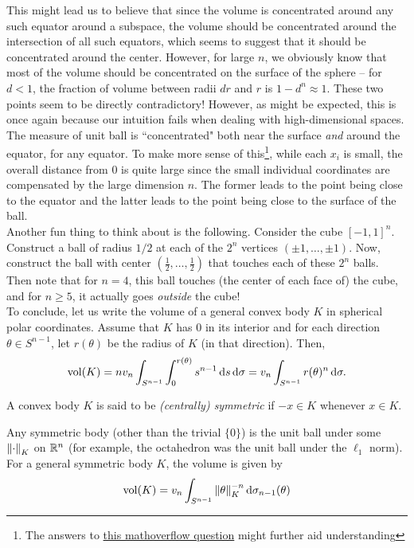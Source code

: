 This might lead us to believe that since the volume is concentrated around any such equator %
around a subspace, the volume should be concentrated around the intersection of all such equators, which seems to suggest that it should be concentrated around the center. However, for large $n$, we obviously know that most of the volume should be concentrated on the surface of the sphere -- for $d < 1$, the fraction of volume between radii $dr$ and $r$ is $1-d^n \approx 1$. These two points seem to be directly contradictory! However, as might be expected, this is once again because our intuition fails when dealing with high-dimensional spaces.\\
The measure of unit ball is ``concentrated" both near the surface \textit{and} around the equator, for any equator. To make more sense of this\footnote{The answers to \href{https://mathoverflow.net/questions/210291/how-to-explain-the-concentration-of-measure-phenomenon-intuitively}{this mathoverflow question} might further aid understanding}, while each $x_i$ is small, the overall distance from $0$ is quite large since the small individual coordinates are compensated by the large dimension $n$. The former leads to the point being close to the equator and the latter leads to the point being close to the surface of the ball.\\

Another fun %
thing to think about is the following. Consider the cube $[-1,1]^n$. Construct a ball of radius $1/2$ at each of the $2^n$ vertices $(\pm 1,\ldots, \pm 1)$. Now, construct the ball with center $(\frac{1}{2},\ldots,\frac{1}{2})$ that touches each of these $2^n$ balls. Then note that for $n=4$, this ball touches (the center of each face of) the cube, and for $n\geq 5$, it actually goes \textit{outside} the cube!\\

To conclude, let us write the volume of a general convex body $K$ in spherical polar coordinates. Assume that $K$ has $0$ in its interior and for each direction $\theta\in S^{n-1}$, let $r(\theta)$ be the radius of $K$ (in that direction). Then,
\begin{equation}
\label{eqn: volume in terms of radial distance}
    \operatorname{vol}(K) = nv_n \int_{S^{n-1}}\int_0^{r(\theta)}s^{n-1}\operatorname{d}\!{s}\operatorname{d}\!{\sigma} = v_n\int_{S^{n-1}} r(\theta)^n\operatorname{d}\!{\sigma}.
\end{equation}

\begin{definition}
A convex body $K$ is said to be \textit{(centrally) symmetric} if $-x\in K$ whenever $x\in K$.
\end{definition}
Any symmetric body (other than the trivial $\{0\}$) is the unit ball under some $\left\lVert\cdot\right\rVert_K$ on $\mathbb{R}^n$ (for example, the octahedron was the unit ball under the $\ell_1$ norm). For a general symmetric body $K$, the volume is given by
\begin{equation}
\label{eqn volume in terms of body's norm}
    \operatorname{vol}(K) = v_n\int_{S^{n-1}} \left\lVert\theta\right\rVert_K^{-n} \operatorname{d}\!{\sigma}_{n-1}(\theta)
\end{equation}

